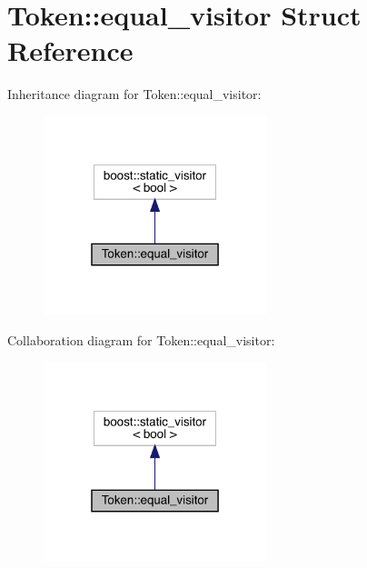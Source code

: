 \hypertarget{struct_token_1_1equal__visitor}{}\section{Token\+:\+:equal\+\_\+visitor Struct Reference}
\label{struct_token_1_1equal__visitor}


Inheritance diagram for Token\+:\+:equal\+\_\+visitor\+:\nopagebreak
\begin{figure}[H]
\begin{center}
\leavevmode
\includegraphics[width=184pt]{struct_token_1_1equal__visitor__inherit__graph}
\end{center}
\end{figure}


Collaboration diagram for Token\+:\+:equal\+\_\+visitor\+:\nopagebreak
\begin{figure}[H]
\begin{center}
\leavevmode
\includegraphics[width=184pt]{struct_token_1_1equal__visitor__coll__graph}
\end{center}
\end{figure}
